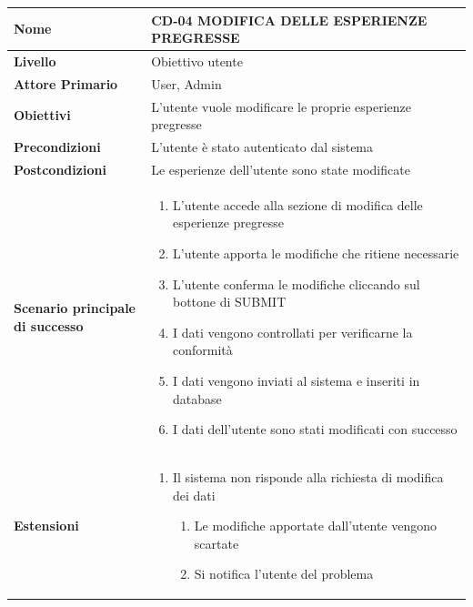 \begin{center}
    \begin{tabular}{|p{0.3\linewidth}|p{0.7\linewidth}|}
    \hline
    \rowcolor{Blue}
    \textbf{Nome} & CD-04 MODIFICA DELLE ESPERIENZE PREGRESSE \\
    \hline
    \rowcolor{DarkBlue}
    \textbf{Livello} & Obiettivo utente \\
    \hline
    \rowcolor{LightBlue}
    \textbf{Attore Primario} & User, Admin \\
    \hline
    \rowcolor{LightBlue}
    \textbf{Obiettivi} & L'utente vuole modificare le proprie esperienze pregresse \\
    \hline
    \rowcolor{Blue}
    \textbf{Precondizioni} & L’utente è stato autenticato dal sistema \\
    \hline
    \rowcolor{LightBlue}
    \textbf{Postcondizioni} & Le esperienze dell’utente sono state modificate \\
    \hline
    \rowcolor{LighterBlue}
        \begin{center}
        \textbf{Scenario principale di successo}
    \end{center} 
    & 
    \begin{enumerate}
        \item L’utente accede alla sezione di modifica delle esperienze pregresse
        \item L’utente apporta le modifiche che ritiene necessarie
        \item L’utente conferma le modifiche cliccando sul bottone di SUBMIT
        \item I dati vengono controllati per verificarne la conformità
        \item I dati vengono inviati al sistema e inseriti in database
        \item I dati dell’utente sono stati modificati con successo
    \end{enumerate}
    \\
    \hline
    \rowcolor{LighterBlue}
    \begin{center}
        \textbf{Estensioni}
    \end{center} 
    & 
    \begin{enumerate}
        \item Il sistema non risponde alla richiesta di modifica dei dati
        \begin{enumerate}
            \item Le modifiche apportate dall’utente vengono scartate
            \item Si notifica l’utente del problema
        \end{enumerate}
    \end{enumerate}
    \\
    \hline
    \end{tabular}
\end{center}

